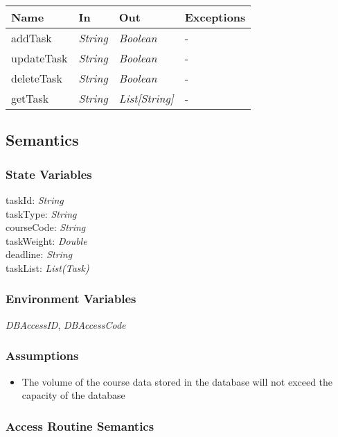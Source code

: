\documentclass[12pt, titlepage]{article}
\begin{document}
\begin{center}
\begin{tabular}{p{4cm} p{3cm} p{3cm} p{3cm}}
\hline
\textbf{Name} & \textbf{In} & \textbf{Out} & \textbf{Exceptions} \\
\hline
addTask&  \textit{String} & \textit{Boolean} & - \\
updateTask&  \textit{String} & \textit{Boolean} & - \\
deleteTask&  \textit{String} & \textit{Boolean} & - \\
getTask&  \textit{String} & \textit{List[String]} & - \\
\hline
\end{tabular}
\end{center}

\subsection{Semantics}

\subsubsection{State Variables}

taskId: \textit{String}\\
taskType: \textit{String}\\
courseCode: \textit{String}\\
taskWeight: \textit{Double}\\
deadline: \textit{String}\\
taskList: \textit{List(Task)}\\



\subsubsection{Environment Variables}

\textit{DBAccessID}, \textit{DBAccessCode}

\subsubsection{Assumptions}

\begin{itemize}
  \item The volume of the course data stored in the database will not exceed the capacity of the database
\end{itemize}

\subsubsection{Access Routine Semantics}
\end{document}
